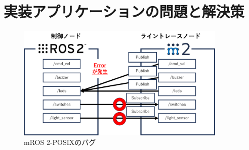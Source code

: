 \section{実装アプリケーションの問題と解決策}
\begin{figure}[h]
    \centering
    \includegraphics[width=10cm]{images/fig4_mros2bug.png}
    \caption{mROS 2-POSIXのバグ}
    \label{fig:mros2bug}
\end{figure}

